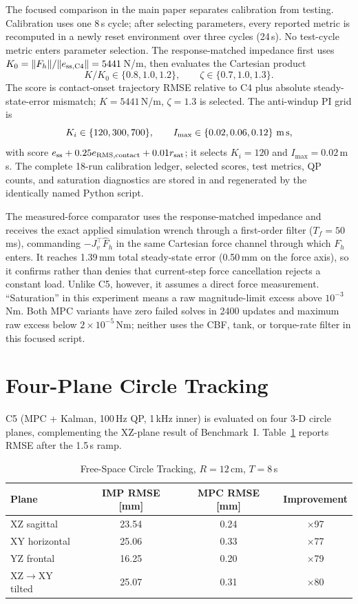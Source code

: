\documentclass[journal]{IEEEtran}
\begin{document}
The focused comparison in the main paper separates calibration from testing.
Calibration uses one 8\,s cycle; after selecting parameters, every reported
metric is recomputed in a newly reset environment over three cycles (24\,s).
No test-cycle metric enters parameter selection. The response-matched
impedance first uses $K_0=\|F_h\|/\|e_{\rm ss,C4}\|=5441$\,N/m, then evaluates
the Cartesian product
\[
K/K_0\in\{0.8,1.0,1.2\},\qquad
\zeta\in\{0.7,1.0,1.3\}.
\]
The score is contact-onset trajectory RMSE relative to C4 plus absolute
steady-state-error mismatch; $K=5441$\,N/m, $\zeta=1.3$ is selected. The
anti-windup PI grid is
\[
K_i\in\{120,300,700\},\qquad
I_{\max}\in\{0.02,0.06,0.12\}\ \text{m\,s},
\]
with score $e_{\rm ss}+0.25e_{\rm RMS,contact}+0.01r_{\rm sat}$; it selects
$K_i=120$ and $I_{\max}=0.02$\,m\,s. The complete 18-run calibration ledger,
selected scores, test metrics, QP counts, and saturation diagnostics are stored
in  and regenerated by
the identically named Python script.

The measured-force comparator uses the response-matched impedance and receives
the exact applied simulation wrench through a first-order filter
($T_f=50$\,ms), commanding $-J_v^\top\hat F_h$ in the same Cartesian force
channel through which $F_h$ enters. It reaches 1.39\,mm total steady-state
error (0.50\,mm on the force axis), so it confirms rather than denies that
current-step force cancellation rejects a constant load. Unlike C5, however,
it assumes a direct force measurement. ``Saturation'' in this experiment means
a raw magnitude-limit excess above $10^{-3}$\,Nm. Both MPC variants have zero
failed solves in 2400 updates and maximum raw excess below
$2\times10^{-5}$\,Nm; neither uses the CBF, tank, or torque-rate filter in this
focused script.

\section{Four-Plane Circle Tracking}\label{sec:planes}

C5 (MPC + Kalman, 100\,Hz QP, 1\,kHz inner) is evaluated on four 3-D
circle planes, complementing the XZ-plane result of Benchmark~I.
Table~\ref{tab:planes} reports RMSE after the 1.5\,s ramp.

\begin{table}[!t]
\caption{Free-Space Circle Tracking, $R=12$\,cm, $T=8$\,s}
\label{tab:planes}
\renewcommand{\arraystretch}{1.0}
\centering
\setlength{\tabcolsep}{4pt}
\footnotesize
\begin{tabular}{@{}lccc@{}}
\toprule
\textbf{Plane} & \textbf{IMP RMSE [mm]} & \textbf{MPC RMSE [mm]} & \textbf{Improvement}\\
\midrule
XZ sagittal  & 23.54 & 0.24 & $\times$97\\
XY horizontal & 25.06 & 0.33 & $\times$77\\
YZ frontal   & 16.25 & 0.20 & $\times$79\\
XZ$\to$XY tilted & 25.07 & 0.31 & $\times$80\\
\bottomrule
\end{tabular}
\end{table}
\end{document}

